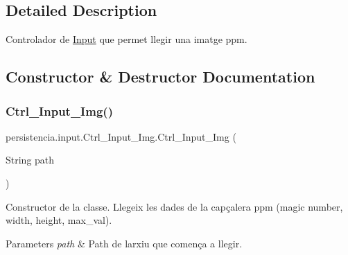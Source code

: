 \subsection{Detailed Description}
Controlador de \hyperlink{classpersistencia_1_1input_1_1Input}{Input} que permet llegir una imatge ppm. 

\subsection{Constructor \& Destructor Documentation}
\mbox{\label{classpersistencia_1_1input_1_1Ctrl__Input__Img_a79318a62df31dfd107554e92e29f6d9a}} 
\subsubsection{\texorpdfstring{Ctrl\+\_\+\+Input\+\_\+\+Img()}{Ctrl\_Input\_Img()}\hspace{0.1cm}{\footnotesize\ttfamily [1/2]}}
{\footnotesize\ttfamily persistencia.\+input.\+Ctrl\+\_\+\+Input\+\_\+\+Img.\+Ctrl\+\_\+\+Input\+\_\+\+Img (\begin{DoxyParamCaption}\item[{String}]{path }\end{DoxyParamCaption})\hspace{0.3cm}{\ttfamily [inline]}}



Constructor de la classe. Llegeix les dades de la capçalera ppm (magic number, width, height, max\+\_\+val). 


\begin{DoxyParams}{Parameters}
{\em path} & Path de l\textquotesingle{}arxiu que comença a llegir. \\
\hline
\end{DoxyParams}

